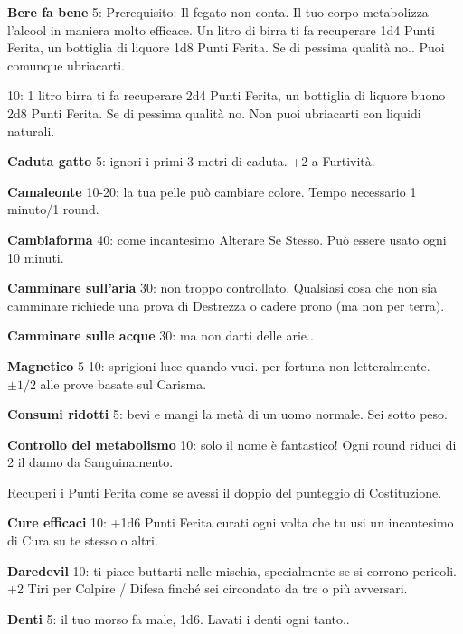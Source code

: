 \documentclass[a4paper,twoside,openany]{book}
\begin{document}
\begin{multicols}{2}


\textbf{Bere fa bene} 5: Prerequisito: Il fegato non conta. Il tuo corpo metabolizza l'alcool in maniera molto efficace. Un litro di birra ti fa recuperare 1d4 Punti Ferita, un bottiglia di liquore 1d8 Punti Ferita. Se di pessima qualità no.. Puoi comunque ubriacarti.

10: 1 litro birra ti fa recuperare 2d4 Punti Ferita, un bottiglia di liquore buono 2d8 Punti Ferita. Se di pessima qualità no. Non puoi ubriacarti con liquidi naturali.

\textbf{Caduta gatto} 5: ignori i primi 3 metri di caduta. +2 a Furtività.

\textbf{Camaleonte} 10-20: la tua pelle può cambiare colore. Tempo necessario 1 minuto/1 round.

\textbf{Cambiaforma} 40: come incantesimo Alterare Se Stesso. Può essere usato ogni 10 minuti.

\textbf{Camminare sull'aria} 30: non troppo controllato. Qualsiasi cosa che non sia camminare richiede una prova di Destrezza o cadere prono (ma non per terra).

\textbf{Camminare sulle acque}  30: ma non darti delle arie..

\textbf{Magnetico} 5-10: sprigioni luce quando vuoi. per fortuna non letteralmente. $\pm1/2$ alle prove basate sul Carisma.

\textbf{Consumi ridotti} 5: bevi e mangi la metà di un uomo normale. Sei sotto peso.

\textbf{Controllo del metabolismo}  10: solo il nome è fantastico! Ogni round riduci di 2 il danno da Sanguinamento.

Recuperi i Punti Ferita come se avessi il doppio del punteggio di Costituzione.

\textbf{Cure efficaci} 10: +1d6 Punti Ferita curati ogni volta che tu usi un incantesimo di Cura su te stesso o altri.

\textbf{Daredevil} 10: ti piace buttarti nelle mischia, specialmente se si corrono pericoli. +2 Tiri per Colpire / Difesa finché sei circondato da tre o più avversari.

\textbf{Denti} 5: il tuo morso fa male, 1d6. Lavati i denti ogni tanto..


\end{multicols}
\end{document}
